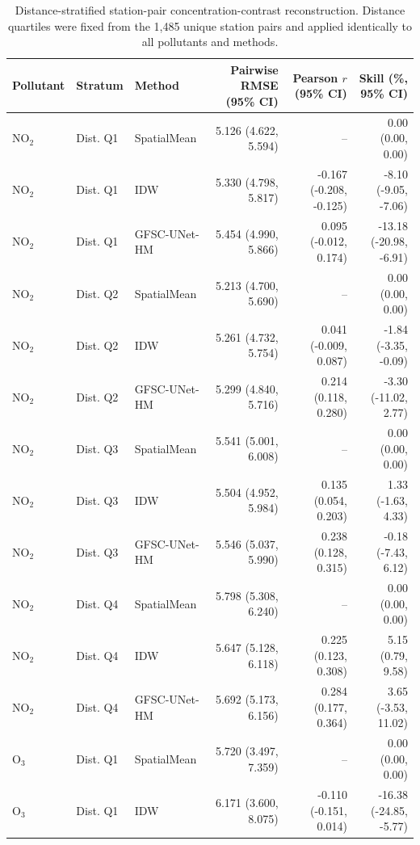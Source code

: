 \begin{table}[t]
\centering
\caption{Distance-stratified station-pair concentration-contrast reconstruction. Distance quartiles were fixed from the 1,485 unique station pairs and applied identically to all pollutants and methods.}
\label{tab:pairwise_distance}
\scriptsize
\setlength{\tabcolsep}{3.5pt}
\begin{tabular}{lllrrr}
\toprule
Pollutant & Stratum & Method & Pairwise RMSE (95\% CI) & Pearson $r$ (95\% CI) & Skill (\%, 95\% CI) \\
\midrule
$\mathrm{NO}_2$ & Dist. Q1 & SpatialMean & 5.126 (4.622, 5.594) & -- & 0.00 (0.00, 0.00) \\
$\mathrm{NO}_2$ & Dist. Q1 & IDW & 5.330 (4.798, 5.817) & -0.167 (-0.208, -0.125) & -8.10 (-9.05, -7.06) \\
$\mathrm{NO}_2$ & Dist. Q1 & GFSC-UNet-HM & 5.454 (4.990, 5.866) & 0.095 (-0.012, 0.174) & -13.18 (-20.98, -6.91) \\
\addlinespace
$\mathrm{NO}_2$ & Dist. Q2 & SpatialMean & 5.213 (4.700, 5.690) & -- & 0.00 (0.00, 0.00) \\
$\mathrm{NO}_2$ & Dist. Q2 & IDW & 5.261 (4.732, 5.754) & 0.041 (-0.009, 0.087) & -1.84 (-3.35, -0.09) \\
$\mathrm{NO}_2$ & Dist. Q2 & GFSC-UNet-HM & 5.299 (4.840, 5.716) & 0.214 (0.118, 0.280) & -3.30 (-11.02, 2.77) \\
\addlinespace
$\mathrm{NO}_2$ & Dist. Q3 & SpatialMean & 5.541 (5.001, 6.008) & -- & 0.00 (0.00, 0.00) \\
$\mathrm{NO}_2$ & Dist. Q3 & IDW & 5.504 (4.952, 5.984) & 0.135 (0.054, 0.203) & 1.33 (-1.63, 4.33) \\
$\mathrm{NO}_2$ & Dist. Q3 & GFSC-UNet-HM & 5.546 (5.037, 5.990) & 0.238 (0.128, 0.315) & -0.18 (-7.43, 6.12) \\
\addlinespace
$\mathrm{NO}_2$ & Dist. Q4 & SpatialMean & 5.798 (5.308, 6.240) & -- & 0.00 (0.00, 0.00) \\
$\mathrm{NO}_2$ & Dist. Q4 & IDW & 5.647 (5.128, 6.118) & 0.225 (0.123, 0.308) & 5.15 (0.79, 9.58) \\
$\mathrm{NO}_2$ & Dist. Q4 & GFSC-UNet-HM & 5.692 (5.173, 6.156) & 0.284 (0.177, 0.364) & 3.65 (-3.53, 11.02) \\
\addlinespace
\midrule
$\mathrm{O}_3$ & Dist. Q1 & SpatialMean & 5.720 (3.497, 7.359) & -- & 0.00 (0.00, 0.00) \\
$\mathrm{O}_3$ & Dist. Q1 & IDW & 6.171 (3.600, 8.075) & -0.110 (-0.151, 0.014) & -16.38 (-24.85, -5.77) \\

\end{tabular}
\end{table}
